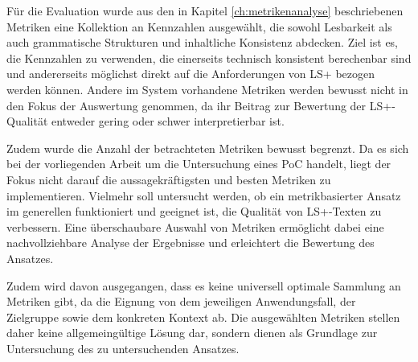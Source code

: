 
Für die Evaluation wurde aus den in Kapitel \ref{ch:metrikenanalyse} beschriebenen Metriken eine Kollektion an Kennzahlen ausgewählt, die sowohl Lesbarkeit als auch grammatische Strukturen und inhaltliche Konsistenz abdecken.
Ziel ist es, die Kennzahlen zu verwenden, die einerseits technisch konsistent berechenbar sind und andererseits möglichst direkt auf die Anforderungen von LS+ bezogen werden können. Andere im System vorhandene Metriken werden bewusst nicht in den Fokus der Auswertung genommen, da ihr Beitrag zur Bewertung der LS+-Qualität entweder gering oder schwer interpretierbar ist.

Zudem wurde die Anzahl der betrachteten Metriken bewusst begrenzt.
Da es sich bei der vorliegenden Arbeit um die Untersuchung eines PoC handelt, liegt der Fokus nicht darauf die aussagekräftigsten und besten Metriken zu implementieren.
Vielmehr soll untersucht werden, ob ein metrikbasierter Ansatz im generellen funktioniert und geeignet ist, die Qualität von LS+-Texten zu verbessern.
Eine überschaubare Auswahl von Metriken ermöglicht dabei eine nachvollziehbare Analyse der Ergebnisse und erleichtert die Bewertung des Ansatzes.

Zudem wird davon ausgegangen, dass es keine universell optimale Sammlung an Metriken gibt, da die Eignung von dem jeweiligen Anwendungsfall, der Zielgruppe sowie dem konkreten Kontext ab.
Die ausgewählten Metriken stellen daher keine allgemeingültige Lösung dar, sondern dienen als Grundlage zur Untersuchung des zu untersuchenden Ansatzes.

